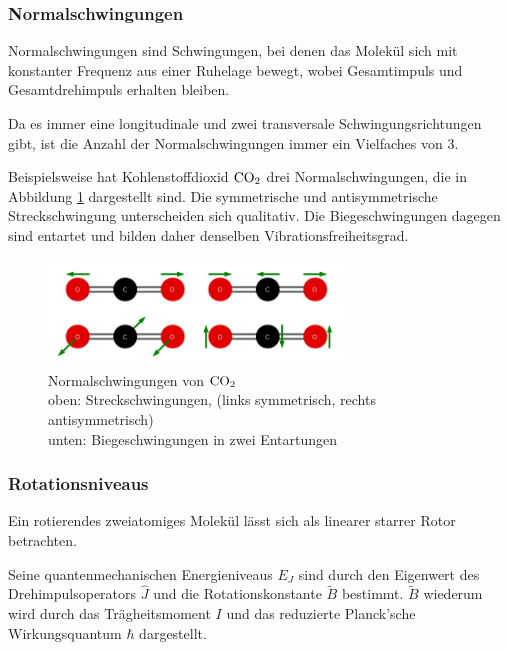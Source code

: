 \documentclass[12pt,a4paper]{scrartcl}
\numberwithin{equation}{section} %
\begin{document}
\subsubsection{Normalschwingungen}
\label{Normalschwingungen}

Normalschwingungen sind Schwingungen, bei denen das Molekül sich mit konstanter Frequenz aus einer Ruhelage bewegt, wobei Gesamtimpuls und Gesamtdrehimpuls erhalten bleiben.

Da es immer eine longitudinale und zwei transversale Schwingungsrichtungen gibt, ist die Anzahl der Normalschwingungen immer ein Vielfaches von $3$. \cite{Gerthsen}

Beispielsweise hat Kohlenstoffdioxid $\ce{CO_2}$ drei Normalschwingungen, die in Abbildung \ref{abb:Normalschwingungen CO2} dargestellt sind. Die symmetrische und antisymmetrische Streckschwingung unterscheiden sich qualitativ. Die Biegeschwingungen dagegen sind entartet und bilden daher denselben Vibrationsfreiheitsgrad.

\begin{figure}[h!]
	\centering
	\includegraphics[width=0.7\textwidth]{../media/B1.1/Normalschwingung_CO2.png}
	\caption{Normalschwingungen von $\ce{CO_2}$ \cite{abb:Schwingungen CO2}\\
		oben: Streckschwingungen, (links symmetrisch, rechts antisymmetrisch)\\
		unten: Biegeschwingungen in zwei Entartungen}
	\label{abb:Normalschwingungen CO2}
\end{figure}

\subsubsection{Rotationsniveaus}
Ein rotierendes zweiatomiges Molekül lässt sich als linearer starrer Rotor betrachten.

Seine quantenmechanischen Energieniveaus $E_J$ sind durch den Eigenwert des Drehimpulsoperators $\hat J$ und die Rotationskonstante $\tilde{B}$ bestimmt. $\tilde{B}$  wiederum wird durch das Trägheitsmoment $I$ und das reduzierte Planck'sche Wirkungsquantum $\hbar$ dargestellt.
\end{document}

